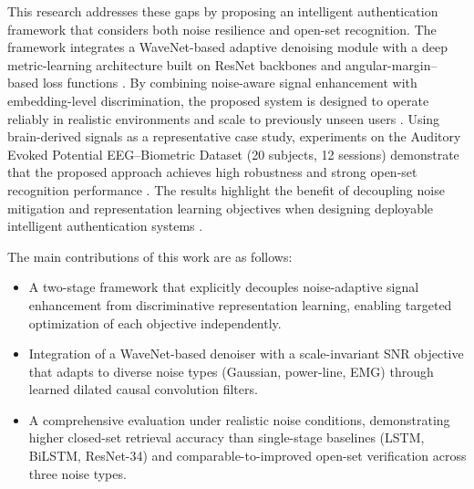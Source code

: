 \documentclass[a4paper,conference]{IEEEtran}
\begin{document}
	This research addresses these gaps by proposing an intelligent authentication framework that considers both noise resilience and open-set recognition. The framework integrates a WaveNet-based adaptive denoising module with a deep metric-learning architecture built on ResNet backbones and angular-margin--based loss functions \cite{He2016,Deng2019,Wang2019}. By combining noise-aware signal enhancement with embedding-level discrimination, the proposed system is designed to operate reliably in realistic environments and scale to previously unseen users \cite{Hadsell2006,Schroff2015,Fallahi2023}. Using brain-derived signals as a representative case study, experiments on the Auditory Evoked Potential EEG--Biometric Dataset (20 subjects, 12 sessions) demonstrate that the proposed approach achieves high robustness and strong open-set recognition performance \cite{Alzahab2024,Fallahi2023,Yang2022}. The results highlight the benefit of decoupling noise mitigation and representation learning objectives when designing deployable intelligent authentication systems \cite{Wang2019,Deng2019}.

	The main contributions of this work are as follows:
	\begin{itemize}
		\item A two-stage framework that explicitly decouples noise-adaptive signal enhancement from discriminative representation learning, enabling targeted optimization of each objective independently.
		\item Integration of a WaveNet-based denoiser with a scale-invariant SNR objective that adapts to diverse noise types (Gaussian, power-line, EMG) through learned dilated causal convolution filters.
		\item A comprehensive evaluation under realistic noise conditions, demonstrating higher closed-set retrieval accuracy than single-stage baselines (LSTM, BiLSTM, ResNet-34) and comparable-to-improved open-set verification across three noise types.
	\end{itemize}
	
\end{document}
